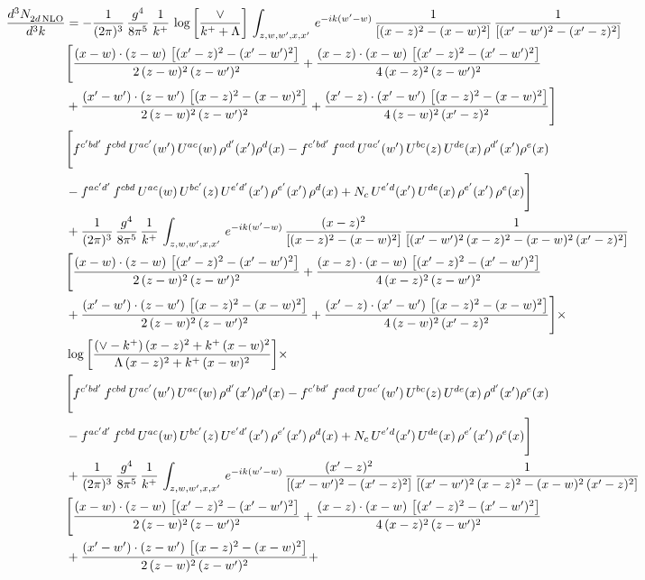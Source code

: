 \documentclass[9pt]{article}
\numberwithin{equation}{section}
\begin{document}
\begin{align}
 \frac{d^{3}N_{2d\,\rm NLO}^{\rm}}{d^{3}k}  & = -\frac{1}{(2\pi)^{3}}\, \frac{g^{4}}{8\pi^{5}}\,\frac{1}{k^{+}}\,\log{\left[\frac{\vee}{k^{+}+\Lambda}\right]}\,\int_{z,w,w^{\prime},x,x'}\, e^{-ik(w^{\prime}-w)}\,\frac{1}{\left[(x-z)^{2}-(x-w)^{2}\right]}\, \frac{1}{\left[(x'-w')^{2}-(x'-z)^{2}\right]}\notag \\ & \Bigg[\frac{(x-w)\cdot (z-w)\, \left[(x'-z)^{2}-(x'-w')^{2}\right]}{2\, (z-w)^{2}\, (z-w')^{2}}  + \frac{(x-z)\cdot (x-w)\,\left[(x'-z)^{2}-(x'-w')^{2}\right] }{4\,(x-z)^{2}\,(z-w')^{2}}\notag \\ & +\frac{(x'-w')\cdot (z-w')\, \left[(x-z)^{2}-(x-w)^{2}\right]}{2\, (z-w)^{2}\, (z-w')^{2}}+ \frac{(x'-z)\cdot (x'-w')\, \left[(x-z)^{2}-(x-w)^{2}\right]}{4\, (z-w)^{2}\,(x'-z)^{2}}\Bigg] \notag \\ &  \Bigg[f^{c'bd'}\,f^{cbd}\, U^{ac'}(w')\,U^{ac}(w)\,\rho^{d'}(x')\rho^{d}(x)- f^{c'bd'}\,f^{acd}\,U^{ac'}(w')\,U^{bc}(z)\,U^{de}(x)\,\rho^{d'}(x')\rho^{e}(x) \notag \\ & -f^{ac'd'}\,f^{cbd}\,U^{ac}(w)\,U^{bc'}(z)\,U^{e'd'}(x')\,\rho^{e'}(x')\,\rho^{d}(x) +N_{c}\,U^{e'd}(x')\,U^{de}(x)\,\rho^{e'}(x')\,\rho^{e}(x)\Bigg] \notag \\ & +\frac{1}{(2\pi)^{3}}\, \frac{g^{4}}{8\pi^{5}}\,\frac{1}{k^{+}}\,\int_{z,w,w^{\prime},x,x'}\, e^{-ik(w^{\prime}-w)}\,\frac{(x-z)^{2}}{\left[(x-z)^{2}-(x-w)^{2}\right]}\,\frac{1}{\left[(x'-w')^{2}\,(x-z)^{2} - (x-w)^{2}\,(x'-z)^{2}\right]}\notag \\ & \Bigg[\frac{(x-w)\cdot (z-w)\, \left[(x'-z)^{2}-(x'-w')^{2}\right]}{2\, (z-w)^{2}\, (z-w')^{2}}  + \frac{(x-z)\cdot (x-w)\,\left[(x'-z)^{2}-(x'-w')^{2}\right] }{4\,(x-z)^{2}\,(z-w')^{2}}\notag \\ & +\frac{(x'-w')\cdot (z-w')\, \left[(x-z)^{2}-(x-w)^{2}\right]}{2\, (z-w)^{2}\, (z-w')^{2}}+ \frac{(x'-z)\cdot (x'-w')\, \left[(x-z)^{2}-(x-w)^{2}\right]}{4\, (z-w)^{2}\,(x'-z)^{2}}\Bigg]\times\,\notag \\ & \log{\left[\frac{(\vee - k^{+})\, (x-z)^{2} + k^{+}\, (x-w)^{2}}{\Lambda\, (x-z)^{2} + k^{+}\, (x-w)^{2}}\right]} \times\notag \\ & \Bigg[f^{c'bd'}\,f^{cbd}\, U^{ac'}(w')\,U^{ac}(w)\,\rho^{d'}(x')\rho^{d}(x)- f^{c'bd'}\,f^{acd}\,U^{ac'}(w')\,U^{bc}(z)\,U^{de}(x)\,\rho^{d'}(x')\rho^{e}(x) \notag \\ & -f^{ac'd'}\,f^{cbd}\,U^{ac}(w)\,U^{bc'}(z)\,U^{e'd'}(x')\,\rho^{e'}(x')\,\rho^{d}(x) +N_{c}\,U^{e'd}(x')\,U^{de}(x)\,\rho^{e'}(x')\,\rho^{e}(x)\Bigg]\notag \\ & +\frac{1}{(2\pi)^{3}}\, \frac{g^{4}}{8\pi^{5}}\,\frac{1}{k^{+}}\,\int_{z,w,w^{\prime},x,x'}\, e^{-ik(w^{\prime}-w)}\,\frac{(x'-z)^{2}}{\left[(x'-w')^{2}-(x'-z)^{2}\right]}\,\frac{1}{\left[(x'-w')^{2}\,(x-z)^{2} - (x-w)^{2}\,(x'-z)^{2}\right]}\notag \\ & \Bigg[\frac{(x-w)\cdot (z-w)\, \left[(x'-z)^{2}-(x'-w')^{2}\right]}{2\, (z-w)^{2}\, (z-w')^{2}}  + \frac{(x-z)\cdot (x-w)\,\left[(x'-z)^{2}-(x'-w')^{2}\right] }{4\,(x-z)^{2}\,(z-w')^{2}}\notag \\ & +\frac{(x'-w')\cdot (z-w')\, \left[(x-z)^{2}-(x-w)^{2}\right]}{2\, (z-w)^{2}\, (z-w')^{2}}+ 
\end{align}
\end{document}
